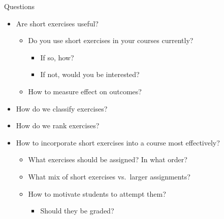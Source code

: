 \documentclass{beamer}
\begin{document}
\begin{frame}{Questions}

\begin{itemize}
\item Are short exercises useful?
  \begin{itemize}
  \item Do you use short exercises in your courses currently?
    \begin{itemize}
    \item If so, how?
    \item If not, would you be interested?
    \end{itemize}
  \item How to measure effect on outcomes?
  \end{itemize}
\item How do we classify exercises?
\item How do we rank exercises?
\item How to incorporate short exercises into a course most effectively?
  \begin{itemize}
  \item What exercises should be assigned? In what order?
  \item What mix of short exercises vs.\ larger assignments?
  \item How to motivate students to attempt them?
    \begin{itemize}
    \item Should they be graded?
    \end{itemize}
  \end{itemize}
\end{itemize}

\end{frame}
\end{document}
